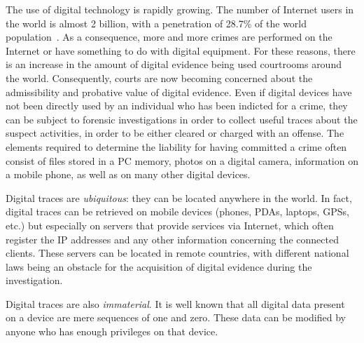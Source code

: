 \documentclass[runningheads]{llncs}
\begin{document}
The use of digital technology is rapidly growing. The number of Internet users in the world is almost 2 billion, with a penetration of
28.7\% of the world population~\cite{stat}. As a consequence, more and more
crimes are performed on the Internet or have something to do with digital
equipment. For these reasons, there is an increase in the amount of digital evidence being used courtrooms around the world.
Consequently, courts are now becoming concerned about the admissibility and probative value of digital evidence. Even if digital devices have not been directly used by an
individual who has been indicted for a crime, they can be subject to
forensic investigations in order to collect useful traces about the suspect activities, in order to be either cleared or charged with an offense. The elements required to 
determine the liability for having committed a crime often consist of files stored in a 
PC memory, photos on a digital camera, information on a mobile phone, as well as on many other digital devices.

Digital traces are \emph{ubiquitous}: they can be located anywhere in the world. In
fact, digital traces can be retrieved on mobile devices (phones, PDAs, laptops,
GPSs, etc.) but especially on servers that provide services via
Internet, which often register the IP addresses and any other information concerning
the connected clients. These servers can be located in remote countries, with different national laws being an obstacle for the acquisition of digital evidence during the investigation.

Digital traces are also \emph{immaterial}. It is well known that all digital data
present on a device are mere sequences of one and zero. These data can be
modified by anyone who has enough privileges on that device.
\end{document}
